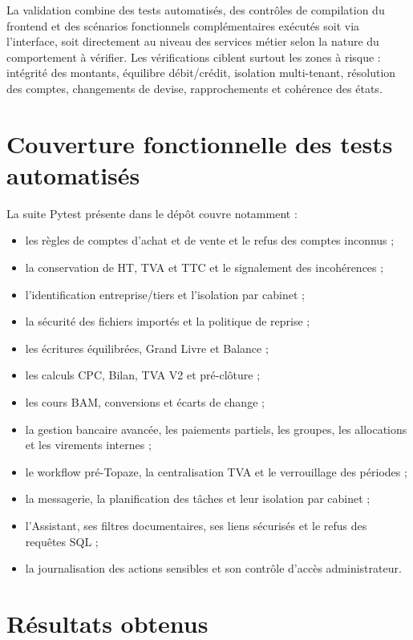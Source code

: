 \documentclass[12pt,a4paper,oneside]{report}
\begin{document}
La validation combine des tests automatisés, des contrôles de compilation du frontend et des scénarios fonctionnels complémentaires exécutés soit via l'interface, soit directement au niveau des services métier selon la nature du comportement à vérifier. Les vérifications ciblent surtout les zones à risque : intégrité des montants, équilibre débit/crédit, isolation multi-tenant, résolution des comptes, changements de devise, rapprochements et cohérence des états.

\section{Couverture fonctionnelle des tests automatisés}

La suite Pytest présente dans le dépôt couvre notamment :

\begin{itemize}[leftmargin=*]
  \item les règles de comptes d'achat et de vente et le refus des comptes inconnus ;
  \item la conservation de HT, TVA et TTC et le signalement des incohérences ;
  \item l'identification entreprise/tiers et l'isolation par cabinet ;
  \item la sécurité des fichiers importés et la politique de reprise ;
  \item les écritures équilibrées, Grand Livre et Balance ;
  \item les calculs CPC, Bilan, TVA V2 et pré-clôture ;
  \item les cours BAM, conversions et écarts de change ;
  \item la gestion bancaire avancée, les paiements partiels, les groupes, les allocations et les virements internes ;
  \item le workflow pré-Topaze, la centralisation TVA et le verrouillage des périodes ;
  \item la messagerie, la planification des tâches et leur isolation par cabinet ;
  \item l'Assistant, ses filtres documentaires, ses liens sécurisés et le refus des requêtes SQL ;
  \item la journalisation des actions sensibles et son contrôle d'accès administrateur.
\end{itemize}

\section{Résultats obtenus}
\end{document}
